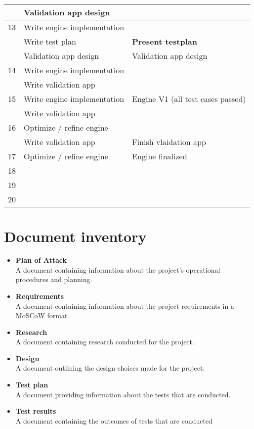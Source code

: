 \documentclass{article} %
\begin{document}
\begin{longtable}{|l|p{}|p{}|}
       & Validation app design & \\ \hline
    13 & Write engine implementation & \\ \hline
       & Write test plan & \textbf{Present testplan} \\ \hline
       & Validation app design & Validation app design \\ \hline
    14 & Write engine implementation &  \\ \hline
       & Write validation app & \\ \hline
    15 & Write engine implementation & Engine V1 (all test cases passed) \\ \hline
       & Write validation app & \\ \hline
    16 & Optimize / refine engine &  \\ \hline
       & Write validation app & Finish vlaidation app \\ \hline
    17 & Optimize / refine engine & Engine finalized \\ \hline
    18 &  &  \\ \hline
    19 &  &  \\ \hline
    20 &  &  \\ \hline
    \end{longtable}
    \newpage

    \section{Document inventory}
    \begin{itemize}
        \item \textbf{Plan of Attack}
        \\
        A document containing information about the project's operational procedures and planning.
        \item \textbf{Requirements}
        \\
        A document containing information about the project requirements in a MoSCoW format
        \item \textbf{Research}
        \\
        A document containing research conducted for the project.
        \item \textbf {Design}
        \\
        A document outlining the design choices made for the project.
        \item \textbf {Test plan}
        \\
        A document providing information about the tests that are conducted.
        \item \textbf {Test results}
        \\
        A document containing the outcomes of tests that are conducted
    \end{itemize}
\end{document}
